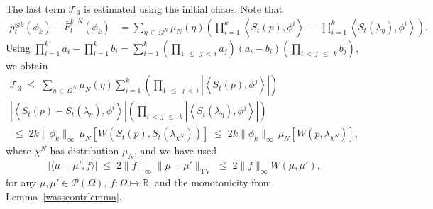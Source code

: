 \documentclass[AHL,Unicode,longabstracts,published]{cedram}
\renewcommand{\leq}{\;\leqslant\;}
\newcommand{\Om}{\Omega}
\newcommand{\scalar}[2]{\langle #1, #2\rangle}
\newcommand{\tv}{\mathrm{TV}}
\newcommand{\cP}{\mathcal{P}}
\newcommand{\cT}{\mathcal{T}}
\newcommand{\bbR}{\mathbb{R}}
\let\O=\Omega
\begin{document}
The last term $\cT_3$ is estimated using the initial chaos. Note that
\begin{align}
p_t^{\otimes k}\left(\phi_k\right)-\bar{F}_t^{k,N}\left(\phi_k\right) & =\sum_{\eta\, \in\,\Om^N}\mu_N(\eta)\left(\prod_{i=1}^k\left\langle S_t(p),\phi^i\right\rangle
\,-\,\prod_{i=1}^k\left\langle S_t(\lambda_{\eta}),\phi^i\right\rangle\right).
\end{align}
Using $\prod_{i=1}^ka_i -\prod_{i=1}^kb_i = \sum_{i=1}^k(\prod_{1\,\leq\,j\,<\,i}a_j)(a_i-b_i)(\prod_{i\,<\,j\,\leq\,k}b_j)$, we obtain
\begin{multline*}
\cT_3
\leq\sum_{\eta\,\in\,\Om^N}\mu_N(\eta)\sum_{i=1}^k\left(\prod_{1\,\leq\,j\,<\,i}\left|\left\langle S_t(p),\phi^j\right\rangle\right|\right)\\
\left|\left\langle S_t(p)-S_t(\lambda_{\eta}),\phi^i\right\rangle\right|
\left(\prod_{i\,<\,j\,\leq\,k}\left|\left\langle S_t(\lambda_{\eta}),\phi^j\right\rangle\right|\right) \\
\leq 2k\|\phi_k\|_{\infty}\,\mu_N \left[W\left(S_t(p),S_t(\lambda_{\chi^N})\right)\right]\leq 2k\|\phi_k\|_{\infty}\,\mu_N \left[W\left(p,\lambda_{\chi^N}\right)\right],
\end{multline*}
where $\chi^N$ has distribution $\mu_N$, and we have used
\begin{align}\label{eq:sta}
|\scalar{\mu-\mu'}{f}|\leq 2\|f\|_\infty \|\mu-\mu'\|_\tv\leq 2\|f\|_\infty W(\mu,\mu'),
\end{align}
for any $\mu,\mu'\in\cP(\O)$, $f:\O\mapsto\bbR$, and the monotonicity from Lemma~\ref{wasscontrlemma}.
\end{document}
